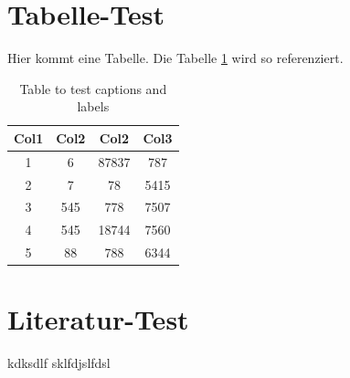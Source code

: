 \section{Tabelle-Test}
Hier kommt eine Tabelle.
Die Tabelle \ref{table:test} wird so referenziert.
\blindtext
 
\begin{table}[h]
\centering
\begin{tabular}{|c|c|c|c|} 
 \hline
 \rowcolor[gray]{0.75} \textbf{Col1} & \textbf{Col2} & \textbf{Col2} & \textbf{Col3} \\
 \hline
 1 & 6 & 87837 & 787 \\ 
 \hline 
 2 & 7 & 78 & 5415 \\
 \hline 
 3 & 545 & 778 & 7507 \\
 \hline
 4 & 545 & 18744 & 7560 \\
 \hline
 5 & 88 & 788 & 6344 \\
 \hline
\end{tabular}
\caption{Table to test captions and labels}
\label{table:test}
\end{table}

\blindtext

\newpage

\section{Literatur-Test}
kdksdlf \cite{brooks2001-silver} sklfdjslfdsl 